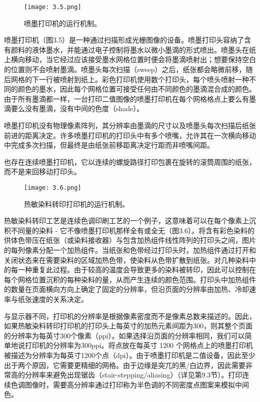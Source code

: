 \documentclass[lang=cn,12pt]{elegantbook}
\begin{document}
\begin{figure}[htb]
\centering
\texttt{[image: 3.5.png]}
\caption{喷墨打印机的运行机制。}
\end{figure}

喷墨打印机（图3.5）是一种通过扫描形成光栅图像的设备。喷墨打印头容纳了含有颜料的液体墨水，并能通过电子控制将墨水以微小墨滴的形式喷出。喷墨头在纸上横向移动，当它经过应该接受墨水网格位置时便会将墨滴喷射出；想要保持空白的位置则不会喷射墨滴。喷墨头每次扫描（sweep）之后，纸张都会略微前移，随后网格的下一行被喷射到纸上。彩色打印机使用数个打印头，每个喷头喷射一种不同的颜色的墨水，因此每个网格位置可接受任何由不同颜色的墨滴混合成的颜色。由于所有墨滴都一样，一台打印二值图像的喷墨打印机在每个网格格点上要么有墨滴要么没有墨滴，没有中间的色度（shade）。

喷墨打印机没有物理像素阵列，其分辨率由墨滴的尺寸以及喷墨头每次扫描后纸张前进的距离决定。许多喷墨打印机的打印头中有多个喷嘴，允许其在一次横向移动中完成多次扫描，但最终是由纸张前移距离决定行距而非喷嘴间距。

\begin{note}
也存在连续喷墨打印机，它以连续的螺旋路径打印包裹在旋转的滚筒周围的纸张，而不是来回移动打印头。
\end{note}

\begin{figure}[htb]
  \centering
  \texttt{[image: 3.6.png]}
  \caption{热敏染料转印打印机的运行机制。}
  \end{figure}

热敏染料转印工艺是连续色调印刷工艺的一个例子，这意味着可以在每个像素上沉积不同量的染料 - 它不像喷墨打印机那样全有或全无（图3.6）。将含有彩色染料的供体色带压在纸张（或染料接收器）与包含加热组件线性阵列的打印头之间，图片的每列像素分配一个加热组件。当纸张和色带经过打印头时，加热组件通过打开和关闭状态来在需要染料的区域加热色带，使染料从色带扩散到纸张。对几种染料中的每一种重复此过程。由于较高的温度会导致更多的染料被转印，因此可以控制在每个网格位置沉积的每种染料的量，从而产生连续的颜色范围。打印头中加热组件的数量在页面横向方向上确定了固定的分辨率，但沿页面的分辨率由加热、冷却速率与纸张速度的关系决定。

与显示器不同，打印机的分辨率是根据像素密度而不是像素总数来描述的。因此，如果热敏染料转印打印机的打印头上每英寸的加热元素间距为300，则其整个页面的分辨率为每英寸300个像素（ppi）。如果选择沿页面的分辨率相同，我们可以简单地说打印机的分辨率为300ppi。将点放在每英寸 1200 个网格点上的喷墨打印机被描述为分辨率为每英寸1200个点（dpi）。由于喷墨打印机是二值设备，因此至少出于两个原因，它需要更精细的网格。由于边缘是突兀的黑/白边界，因此需要非常高的分辨率来避免出现锯齿（stair-stepping/aliasing）（详见第9.3节）。打印连续色调图像时，需要高分辨率通过打印称为半色调的不同密度点图案来模拟中间色。
\end{document}
